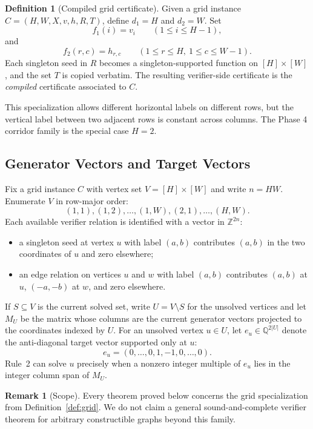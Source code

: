 \documentclass[11pt]{article}
\theoremstyle{definition}
\newtheorem{definition}[theorem]{Definition}
\newtheorem{remark}[theorem]{Remark}
\newcommand{\Z}{\mathbb{Z}}
\newcommand{\Q}{\mathbb{Q}}
\begin{document}
\begin{definition}[Compiled grid certificate]
\label{def:compiled-grid}
Given a grid instance $C=(H,W,X,v,h,R,T)$, define $d_1=H$ and $d_2=W$. Set
\[
f_1(i)=v_i \qquad (1\leq i\leq H-1),
\]
and
\[
f_2(r,c)=h_{r,c} \qquad (1\leq r\leq H,\ 1\leq c\leq W-1).
\]
Each singleton seed in $R$ becomes a singleton-supported function on $[H]\times [W]$, and the set $T$ is copied verbatim. The resulting verifier-side certificate is the \emph{compiled} certificate associated to $C$.
\end{definition}

This specialization allows different horizontal labels on different rows, but the vertical label between two adjacent rows is constant across columns. The Phase 4 corridor family is the special case $H=2$.

\subsection{Generator Vectors and Target Vectors}

Fix a grid instance $C$ with vertex set $V=[H]\times [W]$ and write $n=HW$. Enumerate $V$ in row-major order:
\[
(1,1),(1,2),\dots,(1,W),(2,1),\dots,(H,W).
\]
Each available verifier relation is identified with a vector in $\Z^{2n}$:
\begin{itemize}
  \item a singleton seed at vertex $u$ with label $(a,b)$ contributes $(a,b)$ in the two coordinates of $u$ and zero elsewhere;
  \item an edge relation on vertices $u$ and $w$ with label $(a,b)$ contributes $(a,b)$ at $u$, $(-a,-b)$ at $w$, and zero elsewhere.
\end{itemize}

If $S\subseteq V$ is the current solved set, write $U=V\setminus S$ for the unsolved vertices and let $M_U$ be the matrix whose columns are the current generator vectors projected to the coordinates indexed by $U$. For an unsolved vertex $u\in U$, let $e_u\in \Q^{2|U|}$ denote the anti-diagonal target vector supported only at $u$:
\[
e_u=(0,\dots,0,1,-1,0,\dots,0).
\]
Rule~2 can solve $u$ precisely when a nonzero integer multiple of $e_u$ lies in the integer column span of $M_U$.

\begin{remark}[Scope]
\label{rem:scope}
Every theorem proved below concerns the grid specialization from Definition~\ref{def:grid}. We do not claim a general sound-and-complete verifier theorem for arbitrary constructible graphs beyond this family.
\end{remark}
\end{document}

